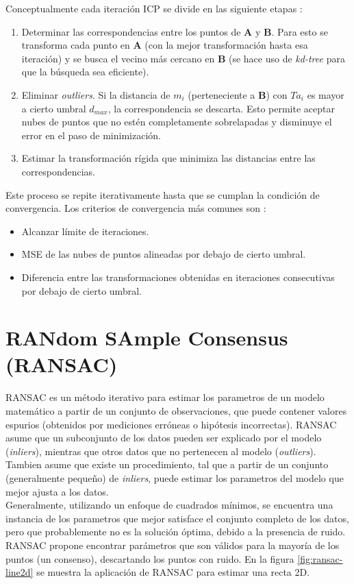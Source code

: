Conceptualmente cada iteración ICP se divide en las siguiente etapas :
\begin{enumerate}

\item Determinar las correspondencias entre los puntos de \textbf{A} y \textbf{B}. Para esto se transforma cada punto en \textbf{A} (con la mejor transformación hasta esa iteración) y se busca el vecino más cercano en \textbf{B} (se hace uso de \textit{\textsl{kd-tree}} \cite{wiki-kdtree} para que la búsqueda sea eficiente).

\item Eliminar \textit{\textsl{outliers}}. Si la distancia de $m_{i}$ (perteneciente a \textbf{B}) con $ T \dot a_{i} $ es mayor a cierto umbral $d_{max}$, la correspondencia se descarta. Esto permite aceptar nubes de puntos que no estén completamente sobrelapadas y disminuye el error en el paso de minimización. 

\item Estimar la transformación rígida que minimiza las distancias entre las correspondencias. 

\end{enumerate}

Este proceso se repite iterativamente hasta que se cumplan la condición de convergencia. 
Los criterios de convergencia más comunes son :
\begin{itemize}
\item Alcanzar límite de iteraciones. 

\item MSE de las nubes de puntos alineadas por debajo de cierto umbral. 

\item Diferencia entre las transformaciones obtenidas en iteraciones consecutivas por debajo de cierto umbral.
\end{itemize}

\section{RANdom SAmple Consensus (RANSAC)}
\label{sec:ransac}
RANSAC \cite{Fischler81} es un método iterativo para estimar los parametros de un modelo matemático a partir de un conjunto de observaciones, que puede contener valores espurios (obtenidos por mediciones erróneas o hipótesis incorrectas). RANSAC asume que un subconjunto de los datos pueden ser explicado por el modelo (\textit{\textsl{inliers}}), mientras que otros datos que no pertenecen al modelo (\textit{\textsl{outliers}}). Tambien asume que existe un procedimiento, tal que a partir de un conjunto (generalmente pequeño) de \textit{\textsl{inliers}}, puede estimar los parametros del modelo que mejor ajusta a los datos. \\
Generalmente, utilizando un enfoque de cuadrados mínimos, se encuentra una instancia de los parametros que mejor satisface el conjunto completo de los datos, pero que probablemente no es la solución óptima, debido a la presencia de ruido. RANSAC propone encontrar parámetros que son válidos para la mayoría de los puntos (un consenso), descartando los puntos con ruido. En la figura \ref{fig:ransac-line2d} se muestra la aplicación de RANSAC para estimar una recta 2D.


